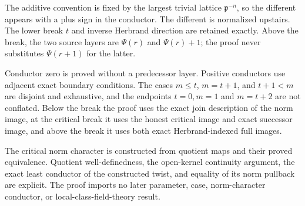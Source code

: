 \begin{theorem}
\leanok
{}
\FormalizationContract
The additive convention is fixed by the largest trivial lattice
$\mathfrak p^{-n}$, so the different appears with a plus sign in the
conductor.  The different is normalized upstairs.  The lower break $t$ and
inverse Herbrand direction are retained exactly.  Above the break, the two
source layers are $\Psi(r)$ and $\Psi(r)+1$; the proof never substitutes
$\Psi(r+1)$ for the latter.

Conductor zero is proved without a predecessor layer.  Positive conductors
use adjacent exact boundary conditions.  The cases $m\le t$, $m=t+1$, and
$t+1<m$ are disjoint and exhaustive, and the endpoints $t=0,m=1$ and
$m=t+2$ are not conflated.  Below the break the proof uses the exact join
description of the norm image, at the critical break it uses the honest
critical image and exact successor image, and above the break it uses both
exact Herbrand-indexed full images.

The critical norm character is constructed from quotient maps and their
proved equivalence.  Quotient well-definedness, the open-kernel continuity
argument, the exact least conductor of the constructed twist, and equality
of its norm pullback are explicit.  The proof imports no later parameter,
case, norm-character conductor, or local-class-field-theory result.
\end{theorem}
